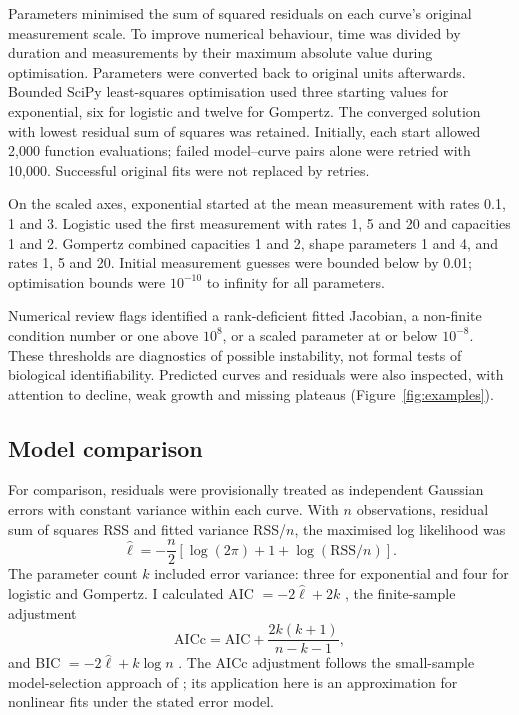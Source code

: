 \documentclass[11pt,a4paper]{article}
\begin{document}
Parameters minimised the sum of squared residuals on each curve's original measurement scale. To improve numerical behaviour, time was divided by duration and measurements by their maximum absolute value during optimisation. Parameters were converted back to original units afterwards. Bounded SciPy least-squares optimisation used three starting values for exponential, six for logistic and twelve for Gompertz. The converged solution with lowest residual sum of squares was retained. Initially, each start allowed 2,000 function evaluations; failed model--curve pairs alone were retried with 10,000. Successful original fits were not replaced by retries.

On the scaled axes, exponential started at the mean measurement with rates 0.1, 1 and 3. Logistic used the first measurement with rates 1, 5 and 20 and capacities 1 and 2. Gompertz combined capacities 1 and 2, shape parameters 1 and 4, and rates 1, 5 and 20. Initial measurement guesses were bounded below by 0.01; optimisation bounds were $10^{-10}$ to infinity for all parameters.

Numerical review flags identified a rank-deficient fitted Jacobian, a non-finite condition number or one above $10^8$, or a scaled parameter at or below $10^{-8}$. These thresholds are diagnostics of possible instability, not formal tests of biological identifiability. Predicted curves and residuals were also inspected, with attention to decline, weak growth and missing plateaus (Figure~\ref{fig:examples}).

\subsection{Model comparison}
For comparison, residuals were provisionally treated as independent Gaussian errors with constant variance within each curve. With $n$ observations, residual sum of squares RSS and fitted variance RSS/$n$, the maximised log likelihood was
\begin{equation}
\widehat{\ell}=-\frac{n}{2}\left[\log(2\pi)+1+\log(\mathrm{RSS}/n)\right].
\end{equation}
The parameter count $k$ included error variance: three for exponential and four for logistic and Gompertz. I calculated AIC $=-2\widehat{\ell}+2k$ \citep{Akaike1974}, the finite-sample adjustment
\begin{equation}
\mathrm{AICc}=\mathrm{AIC}+\frac{2k(k+1)}{n-k-1},
\end{equation}
and BIC $=-2\widehat{\ell}+k\log n$ \citep{Schwarz1978}. The AICc adjustment follows the small-sample model-selection approach of \citet{Hurvich1989}; its application here is an approximation for nonlinear fits under the stated error model.
\end{document}
